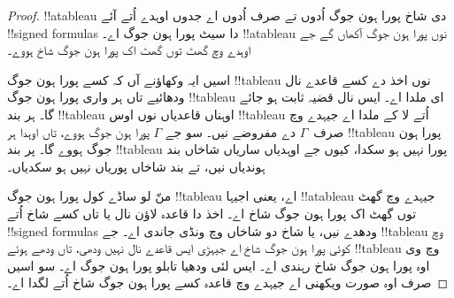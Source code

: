 \documentclass[../../../include/open-logic-section]{subfiles}
\begin{document}
\begin{proof}
!!a{tableau} دی شاخ پورا ہون جوگ اُدوں تے صرف اُدوں اے جدوں اوہدے اُتے
آئے !!{signed formula}s دا سیٹ پورا ہون جوگ اے۔ !!a{tableau} نوں پورا
ہون جوگ آکھاں گے جے اوہدے وچ گھٹ توں گھٹ اک پورا ہون جوگ شاخ ہووے۔

اسیں ایہ وکھاؤنے آں کہ کسے پورا ہون جوگ !!{tableau} نوں اخذ دے
کسے قاعدے نال ودھائیے تاں ہر واری پورا ہون جوگ !!{tableau} ای ملدا اے۔
ایس نال قضیہ ثابت ہو جائے گا۔ ہر بند !!{tableau} اوہناں قاعدیاں نوں
اوس !!{tableau} اُتے لا کے ملدا اے جیہدے وچ صرف~$\Gamma$ دے مفروضے نیں۔
سو جے $\Gamma$ پورا ہون جوگ ہووے، تاں اوہدا ہر !!{tableau} پورا ہون جوگ
ہووے گا۔ پر بند !!{tableau} پورا نہیں ہو سکدا، کیوں جے اوہدیاں ساریاں
شاخاں بند ہوندیاں نیں، تے بند شاخاں پوریاں نہیں ہو سکدیاں۔

منّ لو ساڈے کول پورا ہون جوگ !!{tableau} اے، یعنی اجیہا !!a{tableau}
جیہدے وچ گھٹ توں گھٹ اک پورا ہون جوگ شاخ اے۔ اخذ دا قاعدہ لاؤن نال
یا تاں کسے شاخ اُتے !!{signed formula}s ودھدے نیں، یا شاخ دو شاخاں وچ
ونڈی جاندی اے۔ جے !!{tableau} وچ کوئی پورا ہون جوگ شاخ اے جیہڑی ایس
قاعدے نال نہیں ودھی، تاں ودھے ہوئے !!{tableau} وچ وی اوہ پورا ہون جوگ
شاخ رہندی اے۔ ایس لئی ودھیا تابلو پورا ہون جوگ اے۔ سو اسیں صرف اوہ صورت
ویکھنی اے جیہدے وچ قاعدہ کسے پورا ہون جوگ شاخ اُتے لگدا اے۔


\end{proof}
\end{document}
